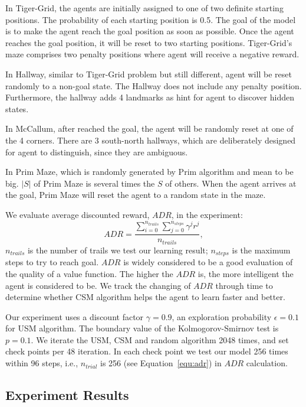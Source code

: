 \documentclass{article}
\begin{document}
In Tiger-Grid, the agents are initially assigned to one of two definite starting positions.
The probability of each starting position is 0.5. The goal of the model is to make the agent
reach the goal position as soon as possible. Once the agent reaches the goal position,
it will be reset to two starting positions. Tiger-Grid's maze comprises two penalty positions
where agent will receive a negative reward. 

In Hallway, similar to Tiger-Grid problem but still different, agent will be reset randomly
to a non-goal state. The Hallway does not include any penalty position. Furthermore, the hallway
adds 4 landmarks as hint for agent to discover hidden states.

In McCallum, after reached the goal, the agent will be randomly reset at one of the 4 corners.
There are 3 south-north hallways, which are deliberately designed for agent to distinguish, since
they are ambiguous. 

In Prim Maze, which is randomly generated by Prim algorithm and mean to be big. $|S|$ of Prim Maze
is several times the $S$ of others. When the agent arrives at the goal, Prim Maze will reset
the agent to a random state in the maze.

We evaluate average discounted reward, $ADR$, in the experiment:
\begin{equation}
  ADR = \frac{\sum_{i=0}^{n_{trails}} \sum_{j=0}^{n_{steps}} \gamma^j r^j}{n_{trails}}, \label{equ:adr}
\end{equation}
$n_{trails}$ is the number of trails we test our learning result; $n_{steps}$ is the maximum
steps to try to reach goal. $ADR$ is widely considered to be a good evaluation of the quality of
a value function. The higher the $ADR$ is, the more intelligent the agent is considered to be.
We track the changing of $ADR$ through time to determine whether CSM algorithm helps the agent to learn
faster and better.
  
Our experiment uses a discount factor $\gamma=0.9$, an exploration probability $\epsilon=0.1$ for USM algorithm.
The boundary value of the Kolmogorov-Smirnov test is $p=0.1$. We iterate the USM, CSM and random algorithm
2048 times, and set check points per 48 iteration. In each check point we test our model 256 times
within 96 steps, i.e., $n_{trial}$ is 256 (see Equation~\ref{equ:adr}) in $ADR$ calculation.

\subsection{Experiment Results}
\end{document}
